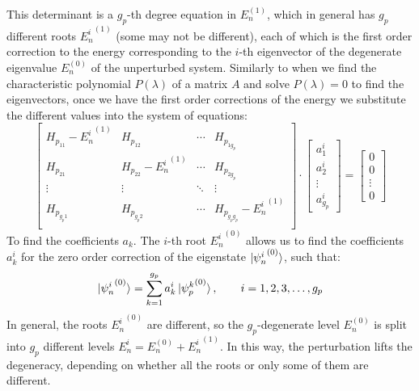 This determinant is a $g_p$-th degree equation in $E_n^{(1)}$, which in general has $g_p$ different roots ${E_n^i}^{(1)}$ (some may not be different), each of which is the first order correction to the energy corresponding to the $i$-th eigenvector of the degenerate eigenvalue $E_n^{(0)}$ of the unperturbed system. Similarly to when we find the characteristic polynomial $P(\lambda)$ of a matrix $A$ and solve $P(\lambda)=0$ to find the eigenvectors, once we have the first order corrections of the energy we substitute the different values into the system of equations:
\begin{equation}
    \begin{bmatrix}
        H_{p_{11}} - {E_n^i}^{(1)} & H_{p_{12}} & \cdots & H_{p_{1g_p}} \\
        H_{p_{21}} & H_{p_{22}}- {E_n^i}^{(1)} & \cdots & H_{p_{2g_p}} \\
        \vdots & \vdots & \ddots & \vdots \\
        H_{p_{g_p1}} & H_{p_{g_p2}} & \cdots & H_{p_{g_pg_p}}- {E_n^i}^{(1)} \\
    \end{bmatrix}\cdot \begin{bmatrix}
        a_1^i \\ a_2^i \\ \vdots \\ a_{g_p}^i 
    \end{bmatrix} = \begin{bmatrix}
        0 \\ 0 \\ \vdots \\ 0 
    \end{bmatrix}
\end{equation}
To find the coefficients $a_k$. The $i$-th root ${E_n^i}^{(0)}$ allows us to find the coefficients $a_k^i$ for the zero order correction of the eigenstate $\ket{{\psi_n^i}^{(0)}}$, such that:
\begin{equation}
    \ket{{\psi_n^i}^{(0)}} = \sum_{k=1}^{g_p} a_k^i\ket{{\psi_p^k}^{(0)}}, \qquad i = 1, 2, 3, \dots, g_p
\end{equation}
In general, the roots ${E_n^i}^{(0)}$ are different, so the $g_p$-degenerate level $E_n^{(0)}$ is split into $g_p$ different levels $E_n^i = E_n^{(0)} + {E_n^i}^{(1)}$. In this way, the perturbation lifts the degeneracy, depending on whether all the roots or only some of them are different.

